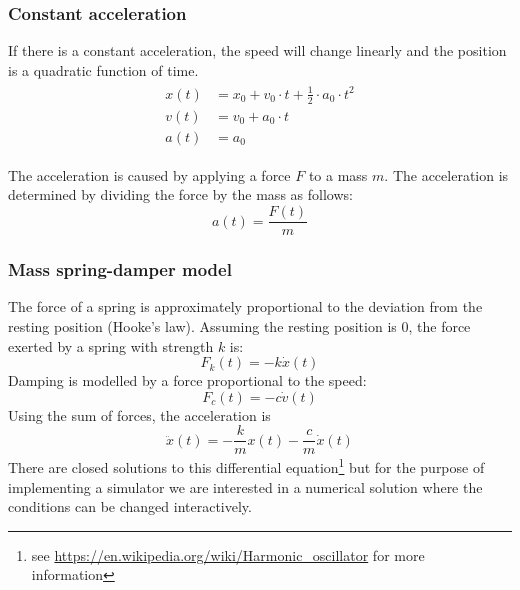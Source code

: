 \documentclass[10pt,a4paper,twoside]{article}
\begin{document}
\subsubsection{Constant acceleration}
If there is a constant acceleration, the speed will change linearly and the position is a quadratic function of time.
\begin{align*}
  \begin{split}
    x(t) & = x_0 + v_0 \cdot t + \frac{1}{2} \cdot a_0 \cdot t^2\\
    v(t) & = v_0 + a_0 \cdot t\\
    a(t) & = a_0
  \end{split}
\end{align*}

The acceleration is caused by applying a force $F$ to a mass $m$.
The acceleration is determined by dividing the force by the mass as follows:
\begin{equation*}
  a(t)=\frac{F(t)}{m}
\end{equation*}

\subsubsection{Mass spring-damper model}
The force of a spring is approximately proportional to the deviation from the resting position (Hooke's law).
Assuming the resting position is $0$, the force exerted by a spring with strength $k$ is:
\begin{equation*}
  F_k(t)=-k\dot x(t)
\end{equation*}
Damping is modelled by a force proportional to the speed:
\begin{equation*}
  F_c(t)=-c\dot v(t)
\end{equation*}
Using the sum of forces, the acceleration is
\begin{equation*}
  \ddot{x}(t)=-\frac{k}{m} x(t)-\frac{c}{m}\dot{x}(t)
\end{equation*}
There are closed solutions to this differential equation\footnote{see \url{https://en.wikipedia.org/wiki/Harmonic_oscillator} for more information} but for the purpose of implementing a simulator we are interested in a numerical solution where the conditions can be changed interactively.




\end{document}
